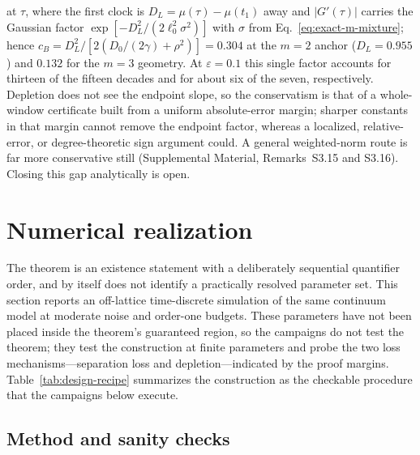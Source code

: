 \documentclass[aps,physrev,reprint,amsmath,amssymb,longbibliography,floatfix]{revtex4-2}
\begin{document}
at \(\tau\), where the first clock is \(D_L=\mu(\tau)-\mu(t_1)\) away
and \(|G'(\tau)|\) carries the Gaussian factor
\(\exp[-D_L^2/(2\ell_0^2\sigma^2)]\) with \(\sigma\) from
Eq.~\eqref{eq:exact-m-mixture}; hence
\(c_B=D_L^2/[2(D_0/(2\gamma)+\rho^2)]=0.304\) at the \(m=2\) anchor
(\(D_L=0.955\)) and \(0.132\) for the \(m=3\) geometry.  At
\(\varepsilon=0.1\) this single factor accounts for thirteen of the fifteen
decades and for about six of the seven, respectively.  Depletion does not see
the endpoint slope, so the conservatism is that of a whole-window
certificate built from a uniform absolute-error margin; sharper constants in
that margin cannot remove the endpoint factor, whereas a localized,
relative-error, or degree-theoretic sign argument could.  A general weighted-norm route is far more
conservative still (Supplemental Material, Remarks~S3.15 and S3.16).
Closing this gap analytically is open.

\section{Numerical realization}
\label{sec:numerics}

The theorem is an existence statement with a deliberately sequential
quantifier order, and by itself does not identify a practically resolved
parameter set.  This section reports an off-lattice time-discrete simulation
of the same continuum model at moderate noise and order-one budgets.  These
parameters have not been placed inside the theorem's guaranteed region, so
the campaigns do not test the theorem; they test the construction at finite
parameters and probe the two loss mechanisms---separation loss and
depletion---indicated by the proof margins.  Table~\ref{tab:design-recipe} summarizes the
construction as the checkable procedure that the campaigns below execute.



\subsection{Method and sanity checks}
\label{sec:numerics-method}
\end{document}
